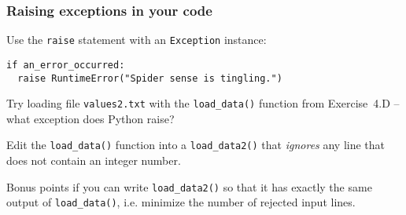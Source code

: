 \documentclass[english,serif,mathserif,xcolor=pdftex,dvipsnames,table]{beamer}
\begin{document}
\begin{frame}[fragile]
  \frametitle{Raising exceptions in your code}
  Use the \lstinline|raise| statement with an \texttt{Exception}
  instance:
\begin{lstlisting}
if an_error_occurred:
  raise RuntimeError("Spider sense is tingling.")
\end{lstlisting}
\end{frame}


\begin{frame}
  \begin{exercise*}[5.A]
    Try loading file \texttt{values2.txt} with the \lstinline`load_data()`
    function from Exercise~4.D -- what exception does Python raise?

    \+
    Edit the \lstinline`load_data()` function into a \lstinline`load_data2()`
    that \emph{ignores} any line that does not contain an integer number.

    \+
    Bonus points if you can write \lstinline`load_data2()` so that it has
    exactly the same output of \lstinline`load_data()`, i.e. minimize the number
    of rejected input lines.
  \end{exercise*}
\end{frame}


\end{document}

